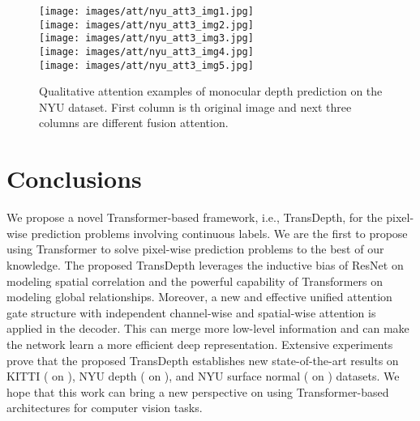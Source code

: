 \documentclass[10pt,twocolumn,letterpaper]{article}
\newcommand{\yang}[1]{{\color{blue}#1}}
\begin{document}
\begin{figure}[!t]
{\begin{minipage}{0.24\linewidth}
        \centering
        \texttt{[image: images/att/nyu\_att3\_img1.jpg]}\\  
        \texttt{[image: images/att/nyu\_att3\_img2.jpg]}\\
        \texttt{[image: images/att/nyu\_att3\_img3.jpg]}\\
        \texttt{[image: images/att/nyu\_att3\_img4.jpg]}\\
        \texttt{[image: images/att/nyu\_att3\_img5.jpg]}\\
\end{minipage}}\centering
\caption{Qualitative attention examples of monocular depth prediction on the NYU dataset. First column is th original image and next three columns are different fusion attention.}
\label{fig:vis_att}
\vspace{-0.4cm}
\end{figure} \section{Conclusions}
We propose a novel Transformer-based framework, i.e., TransDepth, for the pixel-wise prediction problems involving continuous labels. 
We are the first to propose using Transformer to solve pixel-wise prediction problems to the best of our knowledge.
The proposed TransDepth leverages the inductive bias of ResNet on modeling spatial correlation and the powerful capability of Transformers on modeling global relationships. 
Moreover, a new and effective unified attention gate structure with independent channel-wise and spatial-wise attention is applied in the decoder.  This can merge more low-level information and can make the network learn a more efficient deep representation. Extensive experiments prove that the proposed TransDepth establishes new state-of-the-art results on KITTI ( on ), NYU depth ( on ), and NYU surface normal ( on ) datasets.
We hope that this work can bring a new perspective on using Transformer-based architectures for computer vision tasks.
\yang{
} 
{\small


}
\end{document}
